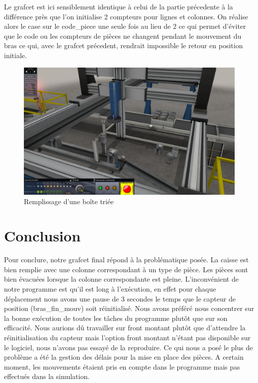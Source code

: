 \documentclass[oneside,a4paper,12pt]{article}
\begin{document}
		Le grafcet est ici sensiblement identique à celui de la partie précedente à la différence près que l'on initialise 2 compteurs pour lignes et colonnes. On réalise alors le case sur le code\_piece une seule fois au lieu de 2 ce qui permet d'éviter que le code ou les compteurs de pièces ne changent pendant le mouvement du bras ce qui, avec le grafcet précedent, rendrait impossible le retour en position initiale.\\
		
		\begin{figure}[h]
			\centering
			\includegraphics[width=13cm]{boite_triee.PNG}
			\caption{Remplissage d'une boîte triée}
		\end{figure}
	
	\section{Conclusion}
	
	Pour conclure, notre grafcet final répond à la problématique posée. La caisse est bien remplie avec une colonne correspondant à un type de pièce. Les pièces sont bien évacuées lorsque la colonne correspondante est pleine. L’inconvénient de notre programme est qu’il est long à l'exécution, en effet pour chaque déplacement nous avons une pause de 3 secondes le temps que le capteur de position (bras\_fin\_mouv) soit réinitialisé. Nous avons préféré nous concentrer sur la bonne exécution de toutes les tâches du programme plutôt que sur son efficacité. Nous aurions dû travailler sur front montant plutôt que d’attendre la réinitialisation du capteur mais l’option front montant n’étant pas disponible sur le logiciel, nous n’avons pas essayé de la reproduire. Ce qui nous a posé le plus de problème a été la gestion des délais pour la mise en place des pièces. A certain moment, les mouvements étaient pris en compte dans le programme mais pas effectués dans la simulation. 
	
\end{document}
